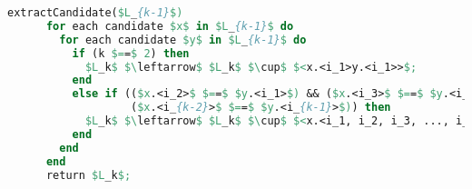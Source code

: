 \begin{lstlisting}[language=Pascal, caption=Алгоритм извлечения кандидата, mathescape]
    extractCandidate($L_{k-1}$)
      for each candidate $x$ in $L_{k-1}$ do
        for each candidate $y$ in $L_{k-1}$ do
          if (k $==$ 2) then
            $L_k$ $\leftarrow$ $L_k$ $\cup$ $<x.<i_1>y.<i_1>>$;
          end
          else if (($x.<i_2>$ $==$ $y.<i_1>$) && ($x.<i_3>$ $==$ $y.<i_2>$) && ...
                   ($x.<i_{k-2}>$ $==$ $y.<i_{k-1}>$)) then
            $L_k$ $\leftarrow$ $L_k$ $\cup$ $<x.<i_1, i_2, i_3, ..., i_{k-1}>y.<i_{k-1}>$;
          end
        end
      end
      return $L_k$;
    \end{lstlisting}

